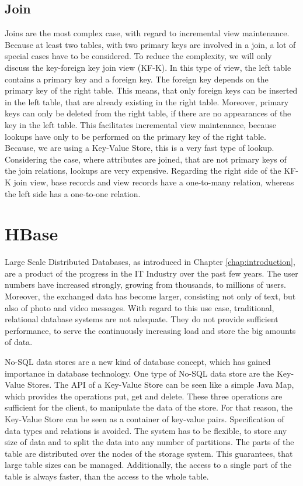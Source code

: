 \documentclass[11pt,a4paper,bibtotoc,idxtotoc,headsepline,footsepline,footexclude,BCOR12mm,DIV13]{scrbook}
\begin{document}
\subsection{Join}
Joins are the most complex case, with regard to incremental view maintenance. Because at least two tables, with two primary keys are involved in a join, a lot of special cases have to be considered. To reduce the complexity, we will only discuss the key-foreign key join view (KF-K). In this type of view, the left table contains a primary key and a foreign key. The foreign key depends on the primary key of the right table. This means, that only foreign keys can be inserted in the left table, that are already existing in the right table. Moreover, primary keys can only be deleted from the right table, if there are no appearances of the key in the left table. This facilitates incremental view maintenance, because lookups have only to be performed on the primary key of the right table. Because, we are using a Key-Value Store, this is a very fast type of lookup. Considering the case, where attributes are joined, that are not primary keys of the join relations, lookups are very expensive. Regarding the right side of the KF-K join view, base records and view records have a one-to-many relation, whereas the left side has a one-to-one relation.




\section{HBase}
\label{sec:hbase}
Large Scale Distributed Databases, as introduced in Chapter \ref{chap:introduction}, are a product of the progress in the IT Industry over the past few years. The user numbers have increased strongly, growing from thousands, to millions of users. Moreover, the exchanged data has become larger, consisting not only of text, but also of photo and video messages. With regard to this use case, traditional, relational database systems are not adequate. They do not provide sufficient performance, to serve the continuously increasing load and store the big amounts of data.

No-SQL data stores are a new kind of database concept, which has gained importance in database technology. One type of No-SQL data store are the Key-Value Stores. The API of a Key-Value Store can be seen like a simple Java Map, which provides the operations put, get and delete. These three operations are sufficient for the client, to manipulate the data of the store. For that reason, the Key-Value Store can be seen as a container of key-value pairs. Specification of data types and relations is avoided. The system has to be flexible, to store any size of data and to split the data into any number of partitions. The parts of the table are distributed over the nodes of the storage system. This guarantees, that large table sizes can be managed. Additionally, the access to a single part of the table is always faster, than the access to the whole table. 
\end{document}
